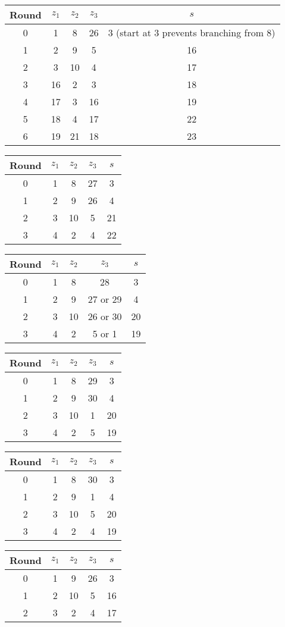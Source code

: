 \begin{tabular}{c | c | c | c | c }
Round & $z_1$ & $z_2$ & $z_3$ & $s$ \\
\hline
0 & 1 & 8 & 26 & 3 (start at 3 prevents branching from 8) \\
1 & 2 & 9 & 5 & 16 \\
2 & 3 & 10 & 4 & 17 \\
3 & 16 & 2 & 3 & 18 \\
4 & 17 & 3 & 16 & 19 \\
5 & 18 & 4 & 17 & 22 \\
6 & 19 & 21 & 18 & 23
\end{tabular}

\begin{tabular}{c | c | c | c | c }
Round & $z_1$ & $z_2$ & $z_3$ & $s$ \\
\hline
0 & 1 & 8 & 27 & 3 \\
1 & 2 & 9 & 26 & 4 \\
2 & 3 & 10 & 5 & 21 \\
3 & 4 & 2 & 4 & 22
\end{tabular}

\begin{tabular}{c | c | c | c | c }
Round & $z_1$ & $z_2$ & $z_3$ & $s$ \\
\hline
0 & 1 & 8 & 28 & 3 \\
1 & 2 & 9 & 27 or 29 & 4 \\
2 & 3 & 10 & 26 or 30 & 20 \\
3 & 4 & 2 & 5 or 1 & 19
\end{tabular}

\begin{tabular}{c | c | c | c | c }
Round & $z_1$ & $z_2$ & $z_3$ & $s$ \\
\hline
0 & 1 & 8 & 29 & 3 \\
1 & 2 & 9 & 30 & 4 \\
2 & 3 & 10 & 1 & 20 \\
3 & 4 & 2 & 5 & 19
\end{tabular}

\begin{tabular}{c | c | c | c | c }
Round & $z_1$ & $z_2$ & $z_3$ & $s$ \\
\hline
0 & 1 & 8 & 30 & 3 \\
1 & 2 & 9 & 1 & 4 \\
2 & 3 & 10 & 5 & 20 \\
3 & 4 & 2 & 4 & 19
\end{tabular}

\begin{tabular}{c | c | c | c | c }
Round & $z_1$ & $z_2$ & $z_3$ & $s$ \\
\hline
0 & 1 & 9 & 26 & 3 \\
1 & 2 & 10 & 5 & 16 \\
2 & 3 & 2 & 4 & 17
\end{tabular}

